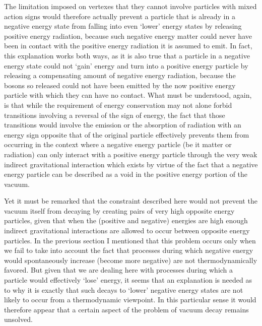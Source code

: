 \documentclass[notitlepage,12pt]{report}
\begin{document}
The limitation imposed on vertexes that they cannot involve particles with mixed action signs would therefore actually prevent a particle that is already in a negative energy state from falling into even `lower' energy states by releasing positive energy radiation, because such negative energy matter could never have been in contact with the positive energy radiation it is assumed to emit. In fact, this explanation works both ways, as it is also true that a particle in a negative energy state could not `gain' energy and turn into a positive energy particle by releasing a compensating amount of negative energy radiation, because the bosons so released could not have been emitted by the now positive energy particle with which they can have no contact. What must be understood, again, is that while the requirement of energy conservation may not alone forbid transitions involving a reversal of the sign of energy, the fact that those transitions would involve the emission or the absorption of radiation with an energy sign opposite that of the original particle effectively prevents them from occurring in the context where a negative energy particle (be it matter or radiation) can only interact with a positive energy particle through the very weak indirect gravitational interaction which exists by virtue of the fact that a negative energy particle can be described as a void in the positive energy portion of the vacuum.

Yet it must be remarked that the constraint described here would not prevent the vacuum itself from decaying by creating pairs of very high opposite energy particles, given that when the (positive and negative) energies are high enough indirect gravitational interactions are allowed to occur between opposite energy particles. In the previous section I mentioned that this problem occurs only when we fail to take into account the fact that processes during which negative energy would spontaneously increase (become more negative) are not thermodynamically favored. But given that we are dealing here with processes during which a particle would effectively `lose' energy, it seems that an explanation is needed as to why it is exactly that such decays to `lower' negative energy states are not likely to occur from a thermodynamic viewpoint. In this particular sense it would therefore appear that a certain aspect of the problem of vacuum decay remains unsolved.
\end{document}
